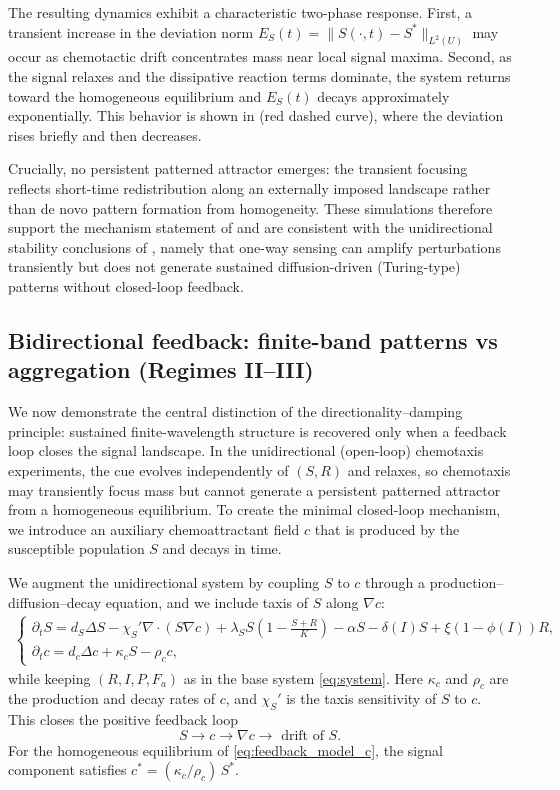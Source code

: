 \documentclass[pdflatex,sn-mathphys-ay]{sn-jnl}
\theoremstyle{thmstyleone}
\theoremstyle{definition}
\theoremstyle{remark}
\begin{document}
The resulting dynamics exhibit a characteristic two-phase response. 
First, a transient increase in the deviation norm $E_S(t)=\|S(\cdot,t)-S^*\|_{L^2(U)}$ may occur as chemotactic drift concentrates mass near local signal maxima. 
Second, as the signal relaxes and the dissipative reaction terms dominate, the system returns toward the homogeneous equilibrium and $E_S(t)$ decays approximately exponentially.
This behavior is shown in  (red dashed curve), where the deviation rises briefly and then decreases.

Crucially, no persistent patterned attractor emerges: the transient focusing reflects short-time redistribution along an externally imposed landscape rather than de novo pattern formation from homogeneity.
These simulations therefore support the mechanism statement of  and are consistent with the unidirectional stability conclusions of , namely that one-way sensing can amplify perturbations transiently but does not generate sustained diffusion-driven (Turing-type) patterns without closed-loop feedback.

\subsection{Bidirectional feedback: finite-band patterns vs aggregation (Regimes II--III)}
\label{subsec:numerical_bifeedback}

We now demonstrate the central distinction of the directionality--damping principle: sustained finite-wavelength structure is recovered only when a feedback loop closes the signal landscape.
In the unidirectional (open-loop) chemotaxis experiments, the cue evolves independently of $(S,R)$ and relaxes, so chemotaxis may transiently focus mass but cannot generate a persistent patterned attractor from a homogeneous equilibrium.
To create the minimal closed-loop mechanism, we introduce an auxiliary chemoattractant field $c$ that is produced by the susceptible population $S$ and decays in time.

We augment the unidirectional system by coupling $S$ to $c$ through a production--diffusion--decay equation, and we include taxis of $S$ along $\nabla c$:
\begin{align}
\label{eq:feedback_model_c}
\begin{cases}
\partial_t S
= d_S \Delta S
- \chi_S' \nabla \cdot (S \nabla c)
+ \lambda_S S\left(1 - \tfrac{S + R}{K}\right)
- \alpha S - \delta(I) S + \xi(1 - \phi(I)) R,
\\[4pt]
\partial_t c
= d_c \Delta c + \kappa_c S - \rho_c c,
\end{cases}
\end{align}
while keeping $(R,I,P,F_a)$ as in the base system \eqref{eq:system}.
Here $\kappa_c$ and $\rho_c$ are the production and decay rates of $c$, and $\chi_S'$ is the taxis sensitivity of $S$ to $c$.
This closes the positive feedback loop 
\[
S\to c\to \nabla c \to \text{ drift of } S.
\]
For the homogeneous equilibrium of \eqref{eq:feedback_model_c}, the signal component satisfies $c^*=(\kappa_c/\rho_c)\,S^*$.
\end{document}
